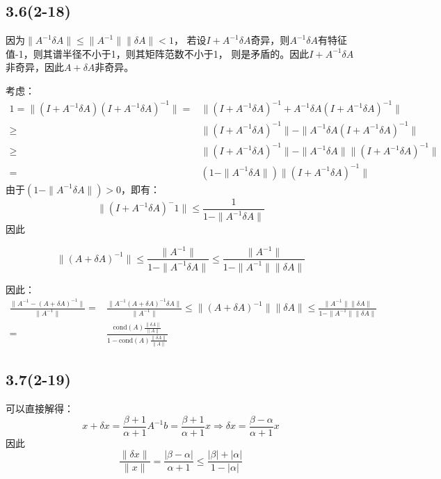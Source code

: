 \documentclass[UTF8,zihao=5]{ctexart}
\begin{document}
\subsection*{3.6(2-18)}

因为$\|A^{-1}\delta A\|\leq\|A^{-1}\|\|\delta A\|< 1$，
若设$I+A^{-1}\delta A$奇异，则$A^{-1}\delta A$有特征值-1，则其谱半径不小于1，则其矩阵范数不小于1，
则是矛盾的。因此$I+A^{-1}\delta A$非奇异，因此$A+\delta A$非奇异。

考虑：
$$
    \begin{aligned}
        1 = \|(I+A^{-1}\delta A)(I+A^{-1}\delta A)^{-1}\| =&
        \|(I+A^{-1}\delta A)^{-1} + A^{-1}\delta A (I+A^{-1}\delta A)^{-1}\|\\
        \geq&
        \|(I+A^{-1}\delta A)^{-1}\| - \| A^{-1}\delta A (I+A^{-1}\delta A)^{-1}\|\\
        \geq&
        \|(I+A^{-1}\delta A)^{-1}\| - \| A^{-1}\delta A\|\| (I+A^{-1}\delta A)^{-1}\|\\
        =&
        (1 - \| A^{-1}\delta A\|)\| (I+A^{-1}\delta A)^{-1}\|
    \end{aligned}
$$
由于$(1 - \| A^{-1}\delta A\|)>0$，即有：
$$
\| (I+A^{-1}\delta A)^-1\|\leq \frac{1}{1 - \| A^{-1}\delta A\|}
$$
因此

\begin{equation}
    \| (A+\delta A)^{-1} \|\leq \frac{\|A^{-1}\|}{1 - \| A^{-1}\delta A\|}
    \leq \frac{\|A^{-1}\|}{1 - \| A^{-1}\|\|\delta A\|}
\end{equation}

因此：
\begin{equation}
    \begin{aligned}
        \frac{\|A^{-1} - (A+\delta A)^{-1}\|}{\|A^{-1}\|} = &
        \frac{\|A^{-1}(A+\delta A)^{-1}\delta A\|}{\|A^{-1}\|} \leq
        \|(A+\delta A)^{-1}\|\|\delta A\|
        \leq
        \frac{\|A^{-1}\|\|\delta A\|}{1 - \| A^{-1}\|\|\delta A\|}\\
        =&
        \frac{\mathrm{cond}(A)\frac{\|\delta A\|}{\|A\|}}
        {1 - \mathrm{cond}(A)\frac{\|\delta A\|}{\|A\|}}
    \end{aligned}
\end{equation}

\subsection*{3.7(2-19)}

可以直接解得：
$$
x+\delta x = \frac{\beta + 1}{\alpha + 1}A^{-1}b = \frac{\beta + 1}{\alpha + 1}x
\Rightarrow \delta x = \frac{\beta - \alpha }{\alpha + 1} x
$$
因此
$$
\frac{\|\delta x\|}{\|x\|}  = \frac{|\beta - \alpha |}{\alpha + 1} 
\leq \frac{|\beta|+|\alpha|}{1-|\alpha|}
$$
\end{document}

